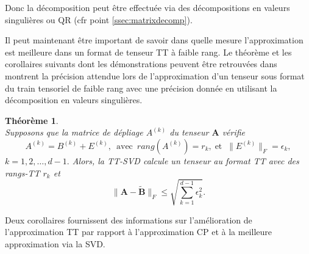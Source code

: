 \documentclass[11pt,a4paper,oneside]{book}
\newtheorem{theo}{Théorème}[chapter]
\begin{document}
Donc la décomposition peut être effectuée via des décompositions en  valeurs singulières ou QR (cfr point \ref{ssec:matrixdecomp}).
\vspace*{0.2cm}


Il peut maintenant être important de savoir dans quelle mesure l'approximation est meilleure dans un format de tenseur TT à faible rang. Le théorème et les corollaires suivants dont les démonstrations  peuvent être retrouvées dans \cite[p.2300]{oseledets2011tensor} montrent la précision attendue lors de l'approximation d'un tenseur sous format du train tensoriel de faible rang avec une précision donnée en utilisant la décomposition en valeurs singulières.

\begin{theo}\label{theo2.2}
	\emph{\\}
Supposons que la matrice de dépliage $A^{(k)}$ du tenseur $\mathbf{A}$ vérifie
		\begin{equation}
	A^{(k)} = B^{(k)}+E^{(k)},\;\ \text{avec} \;\ rang(A^{(k)}) = r_k,
	\; \text{et} \;\; \|E^{(k)}\|_{F} = \epsilon_k, 
	\end{equation}
$k = 1,2,\ldots,d-1.$ Alors, la TT-SVD calcule un tenseur au format TT avec des rangs-TT $r_k$ et
\begin{equation}
\|\mathbf{A}-\tilde{\mathbf{B}}\|_{F} \leq \sqrt{\sum_{k =1}^{d-1}\epsilon_k^2}.
\end{equation}
\end{theo}

Deux corollaires fournissent des informations sur l'amélioration de l'approximation TT par rapport à l'approximation CP et à la meilleure approximation via la SVD.
\end{document}
